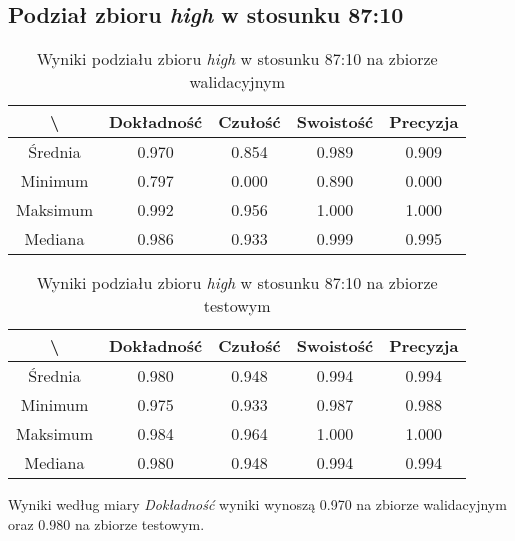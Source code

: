 \subsection{Podział zbioru \textit{high} w stosunku 87:10}


\begin{table}[H]
	\centering
	\caption{Wyniki podziału zbioru \textit{high} w stosunku 87:10 na zbiorze walidacyjnym}
	\vspace{6pt}
	{\footnotesize
		\begin{tabular}{|c|c|c|c|c|}
      \hline \textbackslash & Dokładność & Czułość & Swoistość & Precyzja \\
      \hline Średnia & 0.970 & 0.854 & 0.989 & 0.909 \\
      \hline Minimum & 0.797 & 0.000 & 0.890 & 0.000 \\
      \hline Maksimum & 0.992 & 0.956 & 1.000 & 1.000 \\
      \hline Mediana & 0.986 & 0.933 & 0.999 & 0.995 \\
      \hline
    \end{tabular}
    \label{Tab:highsplitb_val}
	}
	\vspace{0pt}
\end{table}

\begin{table}[H]
	\centering
	\caption{Wyniki podziału zbioru \textit{high} w stosunku 87:10 na zbiorze testowym}
	\vspace{6pt}
	{\footnotesize
		\begin{tabular}{|c|c|c|c|c|}
      \hline \textbackslash & Dokładność & Czułość & Swoistość & Precyzja \\
      \hline Średnia & 0.980 & 0.948 & 0.994 & 0.994 \\
      \hline Minimum & 0.975 & 0.933 & 0.987 & 0.988 \\
      \hline Maksimum & 0.984 & 0.964 & 1.000 & 1.000 \\
      \hline Mediana & 0.980 & 0.948 & 0.994 & 0.994 \\
      \hline
    \end{tabular}
    \label{Tab:highsplitb_test}
	}
	\vspace{0pt}
\end{table}

Wyniki według miary \textit{Dokładność} wyniki wynoszą 0.970 na zbiorze walidacyjnym oraz 0.980 na zbiorze testowym.
